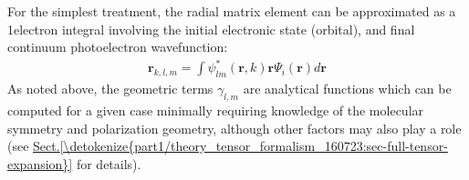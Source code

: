 \documentclass[letterpaper,table,10pt,english]{jupyterBook}
\begin{document}
\sphinxAtStartPar
For the simplest treatment, the radial matrix element can be
approximated as a 1\sphinxhyphen{}electron integral involving the initial electronic
state (orbital), and final continuum photoelectron wavefunction:
\begin{equation}\label{equation:part1/theory_photoionization_dynamics_140723:eq:r-kllam-integral}
\begin{split}\mathbf{r}_{k,l,m}=\int\psi_{lm}^{*}(\boldsymbol{r},k)\boldsymbol{r}\Psi_{i}(\boldsymbol{r})d\boldsymbol{r}
\end{split}
\end{equation}
\sphinxAtStartPar
As noted above, the geometric terms \(\gamma_{l,m}\) are analytical
functions which can be computed for a given case \sphinxhyphen{} minimally requiring
knowledge of the molecular symmetry and polarization geometry, although
other factors may also play a role (see \hyperref[\detokenize{part1/theory_tensor_formalism_160723:sec-full-tensor-expansion}]{Sect.\@ \ref{\detokenize{part1/theory_tensor_formalism_160723:sec-full-tensor-expansion}}} for details).
\end{document}
